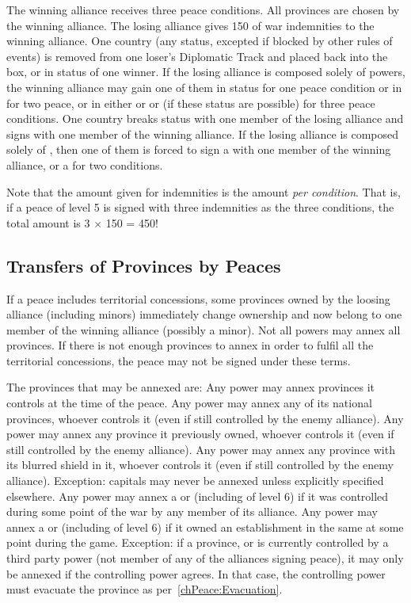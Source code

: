  The winning alliance receives
three peace conditions.
 All provinces are chosen by the winning
alliance.
\bparag[Indemnities] The losing alliance gives 150 \ducats of war indemnities
to the winning alliance.
 One country (any status, excepted if blocked
by other rules of events) is removed from one loser's Diplomatic Track and
placed back into the \Neutral box, or in \MR status of one winner. If the
losing alliance is composed solely of \MIN powers, the winning alliance may
gain one of them in \MR status for one peace condition or in \AM for two
peace, or in either \EG or \VASSAL or \ANNEXION (if these status are possible)
for three peace conditions.
 One \ROTW country breaks status with one
member of the losing alliance and signs \dipFR with one member of the winning
alliance. If the losing alliance is composed solely of \MIN, then one of them
is forced to sign a \dipFR with one member of the winning alliance, or a
\dipAT for two conditions.

\aparag[Indemnities] Note that the amount given for indemnities is the amount
\emph{per condition}. That is, if a peace of level 5 is signed with three
indemnities as the three conditions, the total amount is 3 $\times$ 150 =
450\ducats !

\subsection{Transfers of Provinces by Peaces}\label{chPeace:Transfer
  Provinces Peace}
\aparag If a peace includes territorial concessions, some provinces owned by
the loosing alliance (including minors) immediately change ownership and now
belong to one member of the winning alliance (possibly a minor).
\bparag Not all powers may annex all provinces. If there is not enough
provinces to annex in order to fulfil all the territorial concessions, the
peace may not be signed under these terms.

 The provinces that may be annexed are:
\bparag Any power may annex provinces it controls at the time of the peace.
\bparag Any power may annex any of its national provinces, whoever controls it
(even if still controlled by the enemy alliance).
\bparag Any power may annex any province it previously owned, whoever controls
it (even if still controlled by the enemy alliance).
\bparag Any power may annex any province with its blurred shield in it,
whoever controls it (even if still controlled by the enemy alliance).
\bparag Exception: capitals may never be annexed unless explicitly specified
elsewhere.
\bparag Any power may annex a \TP or \COL (including of level 6) if it was
controlled during some point of the war by any member of its alliance.
\bparag Any power may annex a \TP or \COL (including of level 6) if it owned
an establishment in the same \Area at some point during the game.
\bparag Exception: if a province, \TP or \COL is currently controlled by a
third party power (not member of any of the alliances signing peace), it may
only be annexed if the controlling power agrees. In that case, the controlling
power must evacuate the province as per~\ref{chPeace:Evacuation}.

